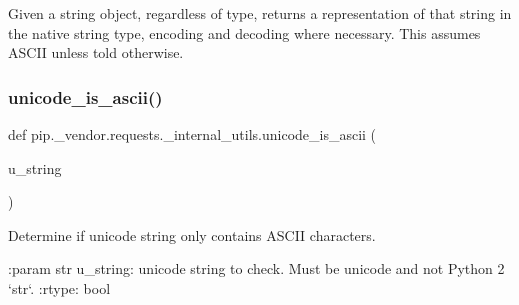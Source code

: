 \begin{DoxyVerb}Given a string object, regardless of type, returns a representation of
that string in the native string type, encoding and decoding where
necessary. This assumes ASCII unless told otherwise.
\end{DoxyVerb}
 \mbox{\label{namespacepip_1_1__vendor_1_1requests_1_1__internal__utils_ab1a1466002e5458924eab81a3a30d0ad}} 
\subsubsection{\texorpdfstring{unicode\+\_\+is\+\_\+ascii()}{unicode\_is\_ascii()}}
{\footnotesize\ttfamily def pip.\+\_\+vendor.\+requests.\+\_\+internal\+\_\+utils.\+unicode\+\_\+is\+\_\+ascii (\begin{DoxyParamCaption}\item[{}]{u\+\_\+string }\end{DoxyParamCaption})}

\begin{DoxyVerb}Determine if unicode string only contains ASCII characters.

:param str u_string: unicode string to check. Must be unicode
    and not Python 2 `str`.
:rtype: bool
\end{DoxyVerb}
 